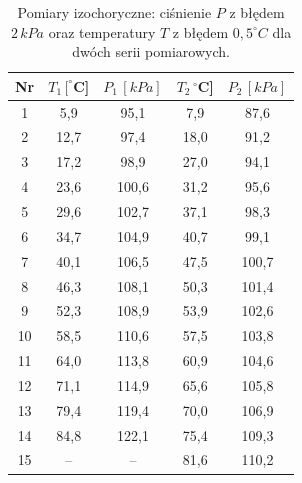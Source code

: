 \documentclass[12pt]{article}
\begin{document}
\begin{table}[H]
    \centering
    \begin{tabular}{c|cc|cc}
        \toprule
        \textbf{Nr} & $T_1 \, [^\circ$C] & $P_1 \, [kPa]$ & $T_2 \, ^\circ$C] & $P_2 \,[kPa]$ \\
        \midrule
        1  & 5{,}9   & 95{,}1  & 7{,}9   & 87{,}6  \\
        2  & 12{,}7  & 97{,}4  & 18{,}0  & 91{,}2  \\
        3  & 17{,}2  & 98{,}9  & 27{,}0  & 94{,}1  \\
        4  & 23{,}6  & 100{,}6 & 31{,}2  & 95{,}6  \\
        5  & 29{,}6  & 102{,}7 & 37{,}1  & 98{,}3  \\
        6  & 34{,}7  & 104{,}9 & 40{,}7  & 99{,}1  \\
        7  & 40{,}1  & 106{,}5 & 47{,}5  & 100{,}7 \\
        8  & 46{,}3  & 108{,}1 & 50{,}3  & 101{,}4 \\
        9  & 52{,}3  & 108{,}9 & 53{,}9  & 102{,}6 \\
        10 & 58{,}5  & 110{,}6 & 57{,}5  & 103{,}8 \\
        11 & 64{,}0  & 113{,}8 & 60{,}9  & 104{,}6 \\
        12 & 71{,}1  & 114{,}9 & 65{,}6  & 105{,}8 \\
        13 & 79{,}4  & 119{,}4 & 70{,}0  & 106{,}9 \\
        14 & 84{,}8  & 122{,}1 & 75{,}4  & 109{,}3 \\
        15 & --     & --      & 81{,}6  & 110{,}2 \\
        \bottomrule
    \end{tabular}
    \caption{Pomiary izochoryczne: ciśnienie $P$ z błędem $2 \, kPa$ oraz temperatury $T$ z błędem $0{,}5 ^\circ C$ dla dwóch serii pomiarowych.}
    \label{tab:isochoric_measurements}
\end{table}
\end{document}
